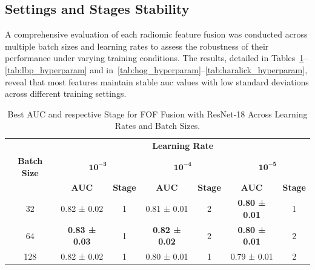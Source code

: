 \subsection{Settings and Stages Stability}

A comprehensive evaluation of each radiomic feature fusion was conducted across multiple batch sizes and learning rates to assess the robustness of their performance under varying training conditions. The results, detailed in Tables~\ref{tab:fof_hyperparam}--\ref{tab:lbp_hyperparam} and in~\ref{tab:hog_hyperparam}--\ref{tab:haralick_hyperparam}, reveal that most features maintain stable \ac{auc} values with low standard deviations across different training settings.

\begin{table}[htbp]
  \centering
  \caption[Best AUC and Stage for FOF Fusion]{Best AUC and respective Stage for FOF Fusion with ResNet-18 Across Learning Rates and Batch Sizes.}
  \label{tab:fof_hyperparam}
  \begin{tabular}{@{} c *{3}{cc} @{}}
    \toprule
    & \multicolumn{6}{c}{\textbf{Learning Rate}} \\
    \cmidrule(lr){2-7}
    \textbf{Batch Size} 
      & \multicolumn{2}{c}{\(\mathbf{10^{-3}}\)} 
      & \multicolumn{2}{c}{\(\mathbf{10^{-4}}\)} 
      & \multicolumn{2}{c}{\(\mathbf{10^{-5}}\)} \\
    \cmidrule(lr){2-3} \cmidrule(lr){4-5} \cmidrule(lr){6-7}
    & \textbf{AUC} & \textbf{Stage} 
    & \textbf{AUC} & \textbf{Stage} 
    & \textbf{AUC} & \textbf{Stage} \\
    \midrule
    32  
      & 0.82 ± 0.02 & 1 
      & 0.81 ± 0.01 & 2 
      & \textbf{0.80 ± 0.01} & 1 \\
    64  
      & \textbf{0.83 ± 0.03} & 1 
      & \textbf{0.82 ± 0.02} & 2 
      & \textbf{0.80 ± 0.01} & 2 \\
    128 
      & 0.82 ± 0.02 & 1 
      & 0.80 ± 0.01 & 1 
      & 0.79 ± 0.01 & 2 \\
    \bottomrule
  \end{tabular}
\end{table}

